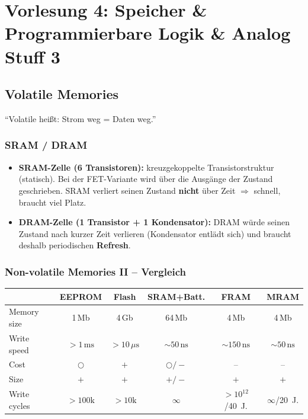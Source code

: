 \documentclass[11pt,a4paper]{article}
\begin{document}
\newpage
\section{Vorlesung 4: Speicher \& Programmierbare Logik \& Analog Stuff 3}

\subsection{Volatile Memories}
``Volatile heißt: Strom weg = Daten weg.''

\subsubsection{SRAM / DRAM}
\begin{itemize}
    \item \textbf{SRAM-Zelle (6 Transistoren):} kreuzgekoppelte Transistorstruktur (statisch). Bei der FET-Variante wird über die Ausgänge der Zustand geschrieben. SRAM verliert seinen Zustand \textbf{nicht} über Zeit $\Rightarrow$ schnell, braucht viel Platz.
    \item \textbf{DRAM-Zelle (1 Transistor + 1 Kondensator):} DRAM würde seinen Zustand nach kurzer Zeit verlieren (Kondensator entlädt sich) und braucht deshalb periodischen \textbf{Refresh}.
\end{itemize}

\subsubsection{Non-volatile Memories II -- Vergleich}
\begin{center}
\begin{tabular}{lccccc}
    \toprule
    & EEPROM & Flash & SRAM+Batt. & FRAM & MRAM \\ \midrule
    Memory size & 1\,Mb & 4\,Gb & 64\,Mb & 4\,Mb & 4\,Mb \\
    Write speed & $>1\,\text{ms}$ & $>10\,\mu\text{s}$ & $\sim 50\,\text{ns}$ & $\sim 150\,\text{ns}$ & $\sim 50\,\text{ns}$ \\
    Cost & $\bigcirc$ & $+$ & $\bigcirc/-$ & -- & -- \\
    Size & $+$ & $+$ & $+/-$ & $+$ & $+$ \\
    Write cycles & $>100\text{k}$ & $>10\text{k}$ & $\infty$ & $>10^{12}$/40~J. & $\infty$/20~J. \\ \bottomrule
\end{tabular}
\end{center}
\end{document}
